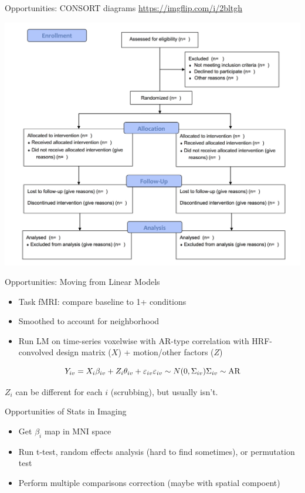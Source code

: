 \documentclass[ignorenonframetext,]{beamer}
\providecommand{\tightlist}{%
  \setlength{\itemsep}{0pt}\setlength{\parskip}{0pt}}
\begin{document}
\begin{frame}[fragile]
\begin{block}{Opportunities: CONSORT diagrams}
\url{https://imgflip.com/i/2bltgh}

\includegraphics[width=0.9\linewidth]{figure/consort}

\end{block}

\begin{block}{Opportunities: Moving from Linear Models}

\begin{itemize}
\tightlist
\item
  Task fMRI: compare baseline to 1+ conditions
\item
  Smoothed to account for neighborhood
\item
  Run LM on time-series voxelwise with AR-type correlation with
  HRF-convolved design matrix (\(X\)) + motion/other factors (\(Z\))
\end{itemize}

\[
Y_{iv} = X_{i} \beta_{iv} + Z_{i}\theta_{iv} + \varepsilon_{iv} \\
\varepsilon_{iv} \sim N(0, \Sigma_{iv}) \\
\Sigma_{iv} \sim \text{AR}
\]

\(Z_{i}\) can be different for each \(i\) (scrubbing), but usually
isn’t.

\end{block}

\begin{block}{Opportunities of Stats in Imaging}

\begin{itemize}
\tightlist
\item
  Get \(β_i\) map in MNI space
\item
  Run t-test, random effects analysis (hard to find sometimes), or
  permutation test
\item
  Perform multiple comparisons correction (maybe with spatial compoent)
\end{itemize}


\end{block}
\end{frame}
\end{document}
